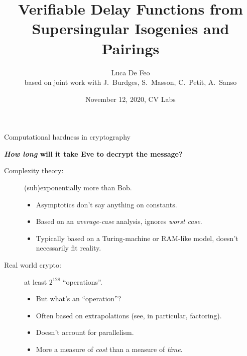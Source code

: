 \documentclass[aspectratio=169]{beamer}
\title[VDFs from Supersingular Isogenies and Pairings]{Verifiable Delay Functions from Supersingular Isogenies and Pairings}
\author[Luca De Feo]{
  Luca De Feo\\[1em]
  based on joint work with J.~Burdges, S.~Masson, C.~Petit, A.~Sanso}
\date{November 12, 2020, CV Labs}
\institute{IBM Research Zürich}
\begin{document}
\frame[plain]{\titlepage}


\begin{frame}{Computational hardness in cryptography}
  \begin{center}
    \framebox{\textcolor{gray}{boring picture of Alice, Bob and Eve goes here}}
  \end{center}

  \medskip
  
  \textbf{\emph{How long} will it take Eve to decrypt the message?}
  \smallskip
  \begin{description}
  \item[Complexity theory:] (sub)exponentially more than Bob.
    \begin{itemize}
    \item Asymptotics don't say anything on constants.
    \item Based on an \emph{average-case} analysis, ignores
      \emph{worst case}.
    \item Typically based on a Turing-machine or RAM-like model,
      doesn't necessarily fit reality.
    \end{itemize}
  \item[Real world crypto:] at least $2^{128}$ ``operations''.
    \begin{itemize}
    \item But what's an ``operation''?
    \item Often based on extrapolations (see, in particular, factoring).
    \item Doesn't account for parallelism.
    \item More a measure of \emph{cost} than a measure of \emph{time}.
    \end{itemize}
  \end{description}
\end{frame}

\end{document}
